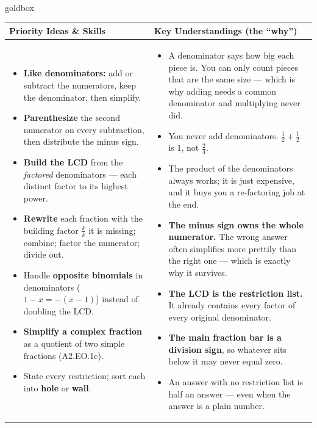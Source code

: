 \documentclass[10pt]{article}
\begin{document}
\renewcommand{\arraystretch}{1.4}
\begin{skillbox}{goldbox}
\begin{tabularx}{\linewidth}{@{}X|X@{}}
\textbf{Priority Ideas \& Skills} & \textbf{Key Understandings (the ``why'')} \\[2pt]
\hline
\vspace{-6pt}
\begin{itemize}[leftmargin=1.1em, nosep, after=\vspace{2pt}]
  \item \textbf{Like denominators:} add or subtract the numerators, keep the denominator, then simplify.
  \item \textbf{Parenthesize} the second numerator on every subtraction, then distribute the minus sign.
  \item \textbf{Build the LCD} from the \emph{factored} denominators --- each distinct factor to its highest power.
  \item \textbf{Rewrite} each fraction with the building factor $\frac kk$ it is missing; combine; factor the numerator; divide out.
  \item Handle \textbf{opposite binomials} in denominators ($1-x=-(x-1)$) instead of doubling the LCD.
  \item \textbf{Simplify a complex fraction} as a quotient of two simple fractions (A2.EO.1c).
  \item State every restriction; sort each into \textbf{hole} or \textbf{wall}.
\end{itemize}
&
\vspace{-6pt}
\begin{itemize}[leftmargin=1.1em, nosep, after=\vspace{2pt}]
  \item A denominator says how big each piece is. You can only count pieces that are the same size --- which is why adding needs a common denominator and multiplying never did.
  \item You never add denominators. $\frac12+\frac12$ is $1$, not $\frac24$.
  \item The product of the denominators always works; it is just expensive, and it buys you a re-factoring job at the end.
  \item \textbf{The minus sign owns the whole numerator.} The wrong answer often simplifies more prettily than the right one --- which is exactly why it survives.
  \item \textbf{The LCD is the restriction list.} It already contains every factor of every original denominator.
  \item \textbf{The main fraction bar is a division sign}, so whatever sits below it may never equal zero.
  \item An answer with no restriction list is half an answer --- even when the answer is a plain number.
\end{itemize}
\end{tabularx}
\end{skillbox}
\end{document}
